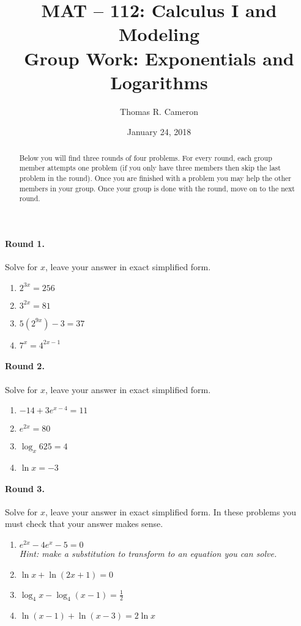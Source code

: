 \documentclass{article}
\title{MAT -- 112: Calculus I and Modeling\\
\large{Group Work: Exponentials and Logarithms}}
\author{Thomas R. Cameron}
\date{January 24, 2018}
\begin{document}
\maketitle

\begin{abstract}
Below you will find three rounds of four problems. For every round, each group member attempts one problem (if you only have three members then skip the last problem in the round). Once you are finished with a problem you may help the other members in your group. Once your group is done with the round, move on to the next round.
\end{abstract}

\paragraph*{Round 1.}
Solve for $x$, leave your answer in exact simplified form. 
\begin{enumerate}
\item	$2^{3x}=256$
\item	$3^{2x}=81$
\item	$5\left(2^{9x}\right)-3=37$
\item	$7^{x}=4^{2x-1}$
\end{enumerate}

\paragraph*{Round 2.}
Solve for $x$, leave your answer in exact simplified form.
\begin{enumerate}
\item	$-14+3e^{x-4}=11$
\item $e^{2x}=80$
\item	$\log_{x}625=4$
\item	$\ln x=-3$
\end{enumerate}

\paragraph*{Round 3.}
Solve for $x$, leave your answer in exact simplified form. In these problems you must check that your answer makes sense. 
\begin{enumerate}
\item	$e^{2x}-4e^{x}-5=0$ \\
\emph{Hint: make a substitution to transform to an equation you can solve.}
\item	$\ln x+\ln(2x+1)=0$
\item	$\log_{4}x-\log_{4}(x-1)=\frac{1}{2}$
\item	$\ln(x-1)+\ln(x-3)=2\ln x$
\end{enumerate}
\end{document}
